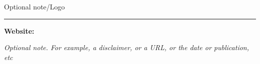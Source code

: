 

\setcounter{page}{0}
\thispagestyle{empty}
\begingroup
\large

{Optional note/Logo}\par

\vspace*{11em}{\huge\bfseries\utitle}\par
\vspace*{1em}{\usubtitle}\par

\rule{\linewidth}{0.4mm}\par

\vspace*{1em}{\bfseries\uauthor}\par
\vspace*{0.25em}{\uaffiliation}\par

\vfill
{\textbf{Website:}\\\uwebsite}\par
\vspace*{2em}
{\itshape Optional note. For example, a disclaimer, or a URL, or the date or publication, etc}\par
\endgroup
\clearpage

